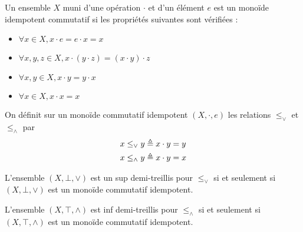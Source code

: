 \begin{definition}
  Un ensemble $X$ muni d'une opération $\cdot$ et d'un élément $e$ est un monoïde
  idempotent commutatif si les propriétés suivantes sont vérifiées :
  \begin{itemize}
  \item $\forall x\in X, x\cdot e = e \cdot x = x$
  \item $\forall x,y,z\in X, x \cdot (y \cdot z) = (x \cdot y) \cdot z$
  \item $\forall x,y\in X, x\cdot y = y \cdot x$
  \item $\forall x\in X, x\cdot x = x$
  \end{itemize}

  On définit sur un monoïde commutatif idempotent $(X,\cdot,e)$ les relations
  $\leq_\lor$ et $\leq_\land$ par
  \begin{align*}
    x \leq_\lor y &\triangleq x \cdot y = y \\
    x \leq_\land y &\triangleq x \cdot y = x
  \end{align*}
\end{definition}

\begin{proposition}
  L'ensemble $(X,\bot,\lor)$ est un sup demi-treillis pour $\leq_\lor$ si et
  seulement si $(X,\bot,\lor)$ est un monoïde commutatif idempotent.

  L'ensemble $(X,\top,\land)$ est inf demi-treillis pour $\leq_\land$ si et
  seulement si $(X,\top,\land)$ est un monoïde commutatif idempotent.
\end{proposition}


